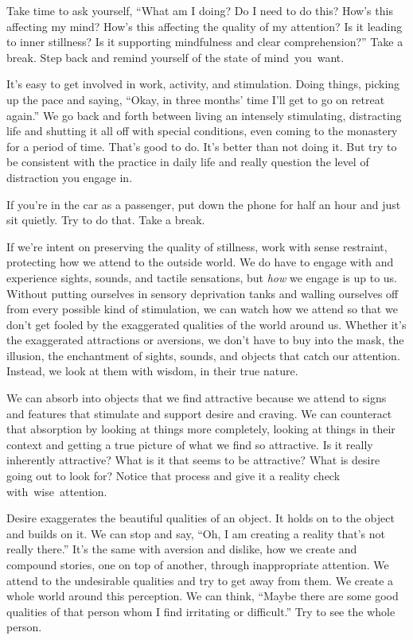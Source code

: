 Take time to ask yourself, ``What am I doing? Do I need to do this? How's this affecting my mind? How's this affecting the quality of my attention? Is it leading to inner stillness? Is it supporting mindfulness and clear comprehension?'' Take a break. Step back and remind yourself of the state of \mbox{mind you want.}

It's easy to get involved in work, activity, and stimulation. Doing things, picking up the pace and saying, ``Okay, in three months' time I'll get to go on retreat again.'' We go back and forth between living an intensely stimulating, distracting life and shutting it all off with special conditions, even coming to the monastery for a period of time. That's good to do. It's better than not doing it. But try to be consistent with the practice in daily life and really question the level of distraction you engage in.

If you're in the car as a passenger, put down the phone for half an hour and just sit quietly. Try to do that. Take a break.

If we're intent on preserving the quality of stillness, work with sense restraint, protecting how we attend to the outside world. We do have to engage with and experience sights, sounds, and tactile sensations, but \emph{how} we engage is up to us. Without putting ourselves in sensory deprivation tanks and walling ourselves off from every possible kind of stimulation, we can watch how we attend so that we don't get fooled by the exaggerated qualities of the world around us. Whether it's the exaggerated attractions or aversions, we don't have to buy into the mask, the illusion, the enchantment of sights, sounds, and objects that catch our attention. Instead, we look at them with wisdom, in their true nature.

We can absorb into objects that we find attractive because we attend to signs and features that stimulate and support desire and craving. We can counteract that absorption by looking at things more completely, looking at things in their context and getting a true picture of what we find so attractive. Is it really inherently attractive? What is it that seems to be attractive? What is desire going out to look for? Notice that process and give it a reality check \mbox{with wise attention.}

Desire exaggerates the beautiful qualities of an object. It holds on to the object and builds on it. We can stop and say, ``Oh, I am creating a reality that's not really there.'' It's the same with aversion and dislike, how we create and compound stories, one on top of another, through inappropriate attention. We attend to the undesirable qualities and try to get away from them. We create a whole world around this perception. We can think, ``Maybe there are some good qualities of that person whom I find irritating or difficult.'' Try to see the whole person.

